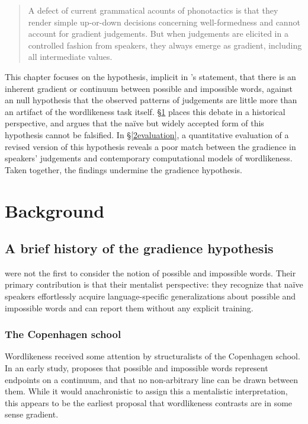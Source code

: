 \begin{quote}
A defect of current grammatical acounts of phonotactics is that they render simple up-or-down decisions concerning well-formedness and cannot account for gradient judgements. But when judgements are elicited in a controlled fashion from speakers, they always emerge as gradient, including all intermediate values. \citep[371]{Shademan2006} 
\end{quote}

This chapter focuses on the hypothesis, implicit in \citeauthor{Shademan2006}'s statement, that there is an inherent gradient or continuum between possible and impossible words, against an null hypothesis that the observed patterns of judgements are little more than an artifact of the wordlikeness task itself. \S\ref{2background} places this debate in a historical perspective, and argues that the naïve but widely accepted form of this hypothesis cannot be falsified. In \S\ref{2evaluation}, a quantitative evaluation of a revised version of this hypothesis reveals a poor match between the gradience in speakers' judgements and contemporary computational models of wordlikeness. Taken together, the findings undermine the gradience hypothesis.

\section{Background}
\label{2background}

\subsection{A brief history of the gradience hypothesis} 
\label{history}

\citeauthor{Chomsky1965} were not the first to consider the notion of possible and impossible words. Their primary contribution is that their mentalist perspective: they recognize that naïve speakers effortlessly acquire language-specific generalizations about possible and impossible words and can report them without any explicit training.

\subsubsection{The Copenhagen school}

Wordlikeness received some attention by structuralists of the Copenhagen school. In an early study, \citet{Fischer-Jorgensen1952} proposes that possible and impossible words represent endpoints on a continuum, and that no non-arbitrary line can be drawn between them. While it would anachronistic to assign this a mentalistic interpretation, this appears to be the earliest proposal that wordlikeness contrasts are in some sense gradient. 

